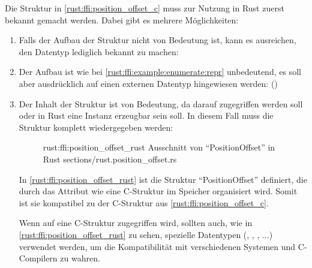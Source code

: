 Die Struktur in \autoref{rust:ffi:position_offset_c} muss zur Nutzung in Rust zuerst bekannt gemacht werden.
Dabei gibt es mehrere Möglichkeiten:
\begin{enumerate}
	\item Falls der Aufbau der Struktur nicht von Bedeutung ist, kann es ausreichen, den Datentyp lediglich bekannt zu machen:  \label{rust:ffi:example:enumerate:repr}
	
	\item Der Aufbau ist wie bei \autoref{rust:ffi:example:enumerate:repr} unbedeutend, es soll aber ausdrücklich auf einen externen Datentyp hingewiesen werden:  \cite{rust:github:extern_type} ()
	
	\item Der Inhalt der Struktur ist von Bedeutung, da darauf zugegriffen werden soll oder in Rust eine Instanz erzeugbar sein soll. In diesem Fall muss die Struktur komplett wiedergegeben werden:
	\begin{figure}[H]
		\rustcinclude
			{rust:ffi:position_offset_rust}
			{Ausschnitt von \enquote{PositionOffset}  in Rust}
			{sections/rust.position_offset.rs}
	\end{figure}
	
	In \autoref{rust:ffi:position_offset_rust} ist die Struktur \enquote{PositionOffset} definiert,
	die durch das Attribut  wie eine C-Struktur im Speicher organisiert wird.
	Somit ist sie kompatibel zu der C-Struktur aus \autoref{rust:ffi:position_offset_c}.
	
	Wenn auf eine C-Struktur zugegriffen wird, sollten auch, wie in \autoref{rust:ffi:position_offset_rust} zu sehen, spezielle Datentypen (, , , ...) verwendet werden, um die Kompatibilität mit verschiedenen Systemen und C-Compilern zu wahren. 
	
	
	

\end{enumerate}

